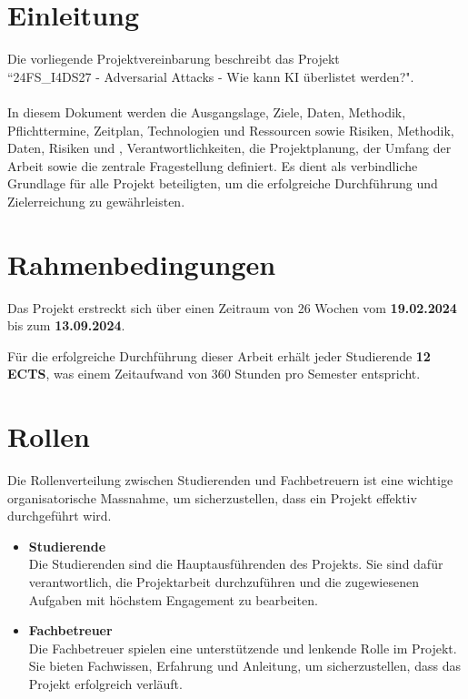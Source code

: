 \section{Einleitung}
Die vorliegende Projektvereinbarung beschreibt das Projekt \\ 
``24FS\_I4DS27 - Adversarial Attacks - Wie kann KI überlistet werden?". \\\\
In diesem Dokument werden die Ausgangslage, Ziele, Daten, Methodik, Pflichttermine, Zeitplan, Technologien und Ressourcen sowie Risiken, Methodik, Daten, Risiken und , Verantwortlichkeiten, die Projektplanung, der Umfang der Arbeit sowie die zentrale Fragestellung definiert. Es dient als verbindliche Grundlage für alle Projekt beteiligten, um die erfolgreiche Durchführung und Zielerreichung zu gewährleisten.

\section{Rahmenbedingungen}
Das Projekt erstreckt sich über einen Zeitraum von 26 Wochen vom \textbf{19.02.2024} bis zum \textbf{13.09.2024}. 

Für die erfolgreiche Durchführung dieser Arbeit erhält jeder Studierende \textbf{12 ECTS}, was einem Zeitaufwand von 360 Stunden pro Semester entspricht. 

\section{Rollen}
Die Rollenverteilung zwischen Studierenden und Fachbetreuern ist eine wichtige organisatorische Massnahme, um sicherzustellen, dass ein Projekt effektiv durchgeführt wird.

\begin{itemize}
    \item \textbf{Studierende} \\
    Die Studierenden sind die Hauptausführenden des Projekts. Sie sind dafür verantwortlich, die Projektarbeit durchzuführen und die zugewiesenen Aufgaben mit höchstem Engagement zu bearbeiten. 
    
    \item \textbf{Fachbetreuer} \\
    Die Fachbetreuer spielen eine unterstützende und lenkende Rolle im Projekt. Sie bieten Fachwissen, Erfahrung und Anleitung, um sicherzustellen, dass das Projekt erfolgreich verläuft. 
\end{itemize}


